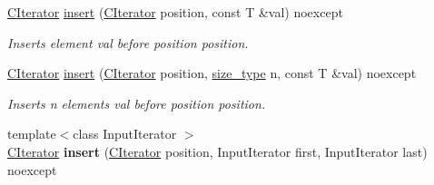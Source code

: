 \begin{DoxyCompactItemize}
\item 
\hyperlink{structnsSdD_1_1CList_1_1CIterator}{C\+Iterator} \hyperlink{classnsSdD_1_1CList_a31b19e63631b2e095e6d81ebb2630db4}{insert} (\hyperlink{structnsSdD_1_1CList_1_1CIterator}{C\+Iterator} position, const T \&val) noexcept
\begin{DoxyCompactList}\small\item\em Inserts element {\ttfamily val} before position {\ttfamily position}. \end{DoxyCompactList}\item 
\hyperlink{structnsSdD_1_1CList_1_1CIterator}{C\+Iterator} \hyperlink{classnsSdD_1_1CList_aa423a9841e74ff8ad11c2b41bc1d698e}{insert} (\hyperlink{structnsSdD_1_1CList_1_1CIterator}{C\+Iterator} position, \hyperlink{classnsSdD_1_1CList_a91d4b6b8c89816da277ee27d32df5478}{size\+\_\+type} n, const T \&val) noexcept
\begin{DoxyCompactList}\small\item\em Inserts {\ttfamily n} elements {\ttfamily val} before position {\ttfamily position}. \end{DoxyCompactList}\item 
\hypertarget{classnsSdD_1_1CList_a9c5fe15f062d696743c99319d4fe1368}{{\footnotesize template$<$class Input\+Iterator $>$ }\\\hyperlink{structnsSdD_1_1CList_1_1CIterator}{C\+Iterator} {\bfseries insert} (\hyperlink{structnsSdD_1_1CList_1_1CIterator}{C\+Iterator} position, Input\+Iterator first, Input\+Iterator last) noexcept}\label{classnsSdD_1_1CList_a9c5fe15f062d696743c99319d4fe1368}


\end{DoxyCompactItemize}
